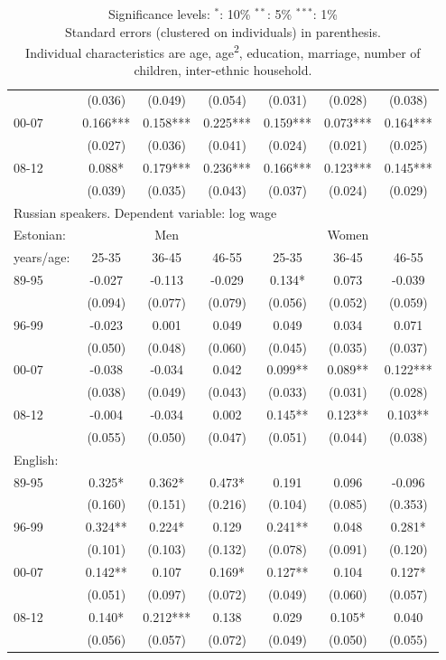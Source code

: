 \documentclass[12pt, a4paper]{article}
\def\tenpc{$^{\ast}$}
\def\fivepc{$^{\ast\ast}$}
\def\onepc{$^{\ast\ast\ast}$}
\newcommand{\legend}{\normalsize{Significance levels:\hspace{1em} \tenpc : 10\% \hspace{1em} \fivepc : 5\% \hspace{1em} \onepc : 1\% \normalsize}}
\newcommand{\modelTwo}{age, age\textsuperscript{2}, education, marriage, number of children, inter-ethnic household} %
\providecommand{\DIFaddend}{} %
\DeclareRobustCommand{\DIFaddend}{\DIFOaddend \let\includegraphics\DIFOincludegraphics} %
\begin{document}
\begin{table}[htbp]
\begin{tabular}{lccc|cc c}
		      & (0.036) & (0.049) & (0.054) & (0.031) & (0.028) & (0.038) \\
		00-07   & 0.166*** & 0.158*** & 0.225*** & 0.159*** & 0.073*** & 0.164*** \\
		      & (0.027) & (0.036) & (0.041) & (0.024) & (0.021) & (0.025) \\
		08-12   & 0.088*  & 0.179*** & 0.236*** & 0.166*** & 0.123*** & 0.145*** \\
		      & (0.039) & (0.035) & (0.043) & (0.037) & (0.024) & (0.029) \\ 
     \midrule
		\multicolumn{7}{l}{Russian speakers. Dependent variable: log wage}\\
		\midrule
		Estonian:&\multicolumn{3}{c|}{Men} &\multicolumn{3}{c}{Women}\\
		years/age: & 25-35  & 36-45  & 46-55  & 25-35  & 36-45  & 46-55  \\
		\midrule
		89-95   & -0.027 & -0.113  & -0.029 & 0.134* & 0.073  & -0.039  \\
		      & (0.094) & (0.077) & (0.079) & (0.056) & (0.052) & (0.059) \\
		96-99   & -0.023 & 0.001  & 0.049  & 0.049  & 0.034  & 0.071  \\
		      & (0.050) & (0.048) & (0.060) & (0.045) & (0.035) & (0.037) \\
		00-07   & -0.038 & -0.034  & 0.042  & 0.099** & 0.089** & 0.122*** \\
		      & (0.038) & (0.049) & (0.043) & (0.033) & (0.031) & (0.028) \\
		08-12   & -0.004 & -0.034  & 0.002  & 0.145** & 0.123** & 0.103** \\
		      & (0.055) & (0.050) & (0.047) & (0.051) & (0.044) & (0.038) \\ \midrule
		English:  &     &     &     &     &     & 
           \\

		89-95   & 0.325* & 0.362*  & 0.473* & 0.191  & 0.096  & -0.096  \\
		      & (0.160) & (0.151) & (0.216) & (0.104) & (0.085) & (0.353) \\
		96-99   & 0.324** & 0.224*  & 0.129  & 0.241** & 0.048  & 0.281*  \\
		      & (0.101) & (0.103) & (0.132) & (0.078) & (0.091) & (0.120) \\
		00-07   & 0.142** & 0.107  & 0.169* & 0.127** & 0.104  & 0.127*  \\
		      & (0.051) & (0.097) & (0.072) & (0.049) & (0.060) & (0.057) \\
		08-12   & 0.140* & 0.212*** & 0.138  & 0.029  & 0.105* & 0.040  \\
		      & (0.056) & (0.057) & (0.072) & (0.049) & (0.050) & (0.055) \\
		\bottomrule
	\end{tabular}

	\caption*{\legend \\ Standard errors (clustered on individuals) in parenthesis. \\ Individual characteristics are \modelTwo. 	}
	\label{tab:age_group_trend}
\end{table}
\DIFaddend 
\end{document}
